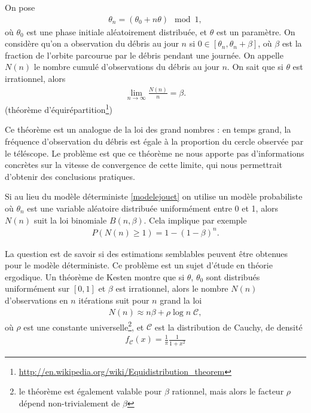 \documentclass[a4paper,11pt]{article}
\renewcommand{\geq}{\geqslant}
\numberwithin{section}{part}
\begin{document}
On pose
\begin{align}
  \label{modelejouet}
  \theta_{n} = (\theta_{0} + n \theta) \mod 1,
\end{align}
où $\theta_{0}$ est une phase initiale aléatoirement distribuée, et
$\theta$ est un paramètre. On considère qu'on a observation du débris
au jour $n$ si $0 \in [\theta_{n}, \theta_{n}+\beta]$, où $\beta$ est
la fraction de l'orbite parcourue par le débris pendant une
journée. On appelle $N(n)$ le nombre cumulé d'observations du débris
au jour $n$. On sait que si $\theta$ est irrationnel, alors
\begin{align}
  \label{largenumbers}
  \lim_{n\to\infty} \frac{N(n)} n = \beta.
\end{align}
(théorème d'équirépartition\footnote{\url{http://en.wikipedia.org/wiki/Equidistribution_theorem}})

Ce théorème est un analogue de la loi des grand nombres : en temps
grand, la fréquence d'observation du débris est égale à la proportion
du cercle observée par le téléscope. Le problème est que ce théorème
ne nous apporte pas d'informations concrètes sur la vitesse de
convergence de cette limite, qui nous permettrait d'obtenir des
conclusions pratiques. 

Si au lieu du modèle déterministe \eqref{modelejouet} on utilise un
modèle probabiliste où $\theta_{n}$ est une variable aléatoire
distribuée uniformément entre 0 et 1, alors $N(n)$ suit la loi
binomiale $B(n,\beta)$. Cela implique par exemple
\begin{align}
  P(N(n) \geq 1) = 1 - (1-\beta)^{n}.
\end{align}

La question est de savoir si des estimations semblables peuvent être
obtenues pour le modèle déterministe. Ce problème est un sujet d'étude
en théorie ergodique. Un théorème de Kesten\cite{kesten} montre que si
$\theta$, $\theta_{0}$ sont distribués uniformément sur $[0,1]$ et
$\beta$ est irrationnel, alors le nombre $N(n)$ d'observations en $n$
itérations suit pour $n$ grand la loi
\begin{align}
  N(n) \approx n \beta + {\rho} \log n\; \mathcal C,
\end{align}
où $\rho$ est une constante universelle\footnote{le théorème est
  également valable pour $\beta$ rationnel, mais alors le facteur
  $\rho$ dépend non-trivialement de $\beta$}, et $\mathcal C$ est la
distribution de Cauchy, de densité
\begin{align}
  f_{\mathcal C}(x) = \frac 1 \pi \frac 1 {1+x^{2}}
\end{align}
\end{document}
